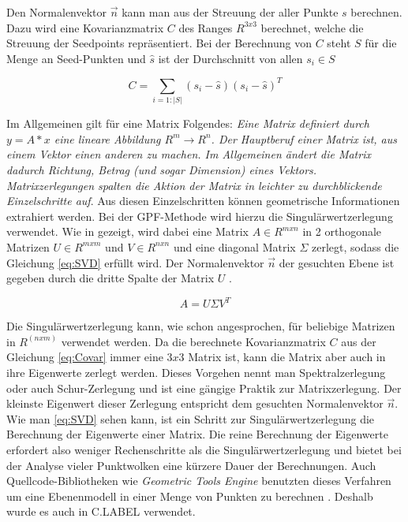 Den Normalenvektor $\vec{n}$ kann man aus der Streuung der aller Punkte $s$ berechnen. Dazu wird eine Kovarianzmatrix $C$ des Ranges $R^{3x3}$ berechnet, welche die Streuung der Seedpoints repräsentiert. Bei der Berechnung von $C$ steht $S$ für die Menge an Seed-Punkten und $\hat{s}$ ist der Durchschnitt von allen $s_i \in S$

\begin{equation} 
C=\sum_{i=1:\vert S\vert }(s_{i}-\hat{s})(s_{i}-\hat{s})^{T}
\label{eq:Covar} 
\end{equation}

Im Allgemeinen gilt für eine Matrix Folgendes: \glqq \textit{Eine Matrix definiert durch $y=A*x$ eine lineare Abbildung $R^m \to R^n$. Der Hauptberuf einer Matrix ist, aus einem Vektor einen anderen zu machen. Im Allgemeinen ändert die Matrix dadurch Richtung, Betrag (und sogar
Dimension) eines Vektors. Matrixzerlegungen spalten die Aktion der Matrix in leichter zu durchblickende Einzelschritte auf}\grqq \cite{bib:Decomposion}. Aus diesen Einzelschritten können geometrische Informationen extrahiert werden. Bei der GPF-Methode wird hierzu die Singulärwertzerlegung verwendet. Wie in \cite{bib:SVD} gezeigt, wird dabei eine Matrix $A \in R^{mxn}$ in 2 orthogonale Matrizen $U \in R^{mxm}$ und $V\in R^{nxn}$ und eine diagonal Matrix $\Sigma$ zerlegt, sodass die Gleichung \ref{eq:SVD} erfüllt wird. Der Normalenvektor $\vec{n}$ der gesuchten Ebene ist gegeben durch die dritte Spalte der Matrix $U$ \cite{bib:SVDforFitting}.

\begin{equation} 
A=U \Sigma V^T
\label{eq:SVD}
\end{equation}

Die Singulärwertzerlegung kann, wie schon angesprochen, für beliebige Matrizen in $R^(nxm)$ verwendet werden. Da die berechnete Kovarianzmatrix $C$ aus der Gleichung \ref{eq:Covar} immer eine $3x3$ Matrix ist, kann die Matrix aber auch in ihre Eigenwerte zerlegt werden. 
Dieses Vorgehen nennt man Spektralzerlegung oder auch Schur-Zerlegung und ist eine gängige Praktik zur Matrixzerlegung. Der kleinste Eigenwert dieser Zerlegung entspricht dem gesuchten Normalenvektor $\vec{n}$. Wie man \ref{eq:SVD} sehen kann, ist ein Schritt zur Singulärwertzerlegung die Berechnung der Eigenwerte einer Matrix. Die reine Berechnung der Eigenwerte erfordert also weniger Rechenschritte als die Singulärwertzerlegung und bietet bei der Analyse vieler Punktwolken eine kürzere Dauer der Berechnungen. Auch Quellcode-Bibliotheken wie \textit{Geometric Tools Engine} benutzten dieses Verfahren um eine Ebenenmodell in einer Menge von Punkten zu berechnen \cite{bib:g3sharp}. Deshalb wurde es auch in C.LABEL verwendet.\\

